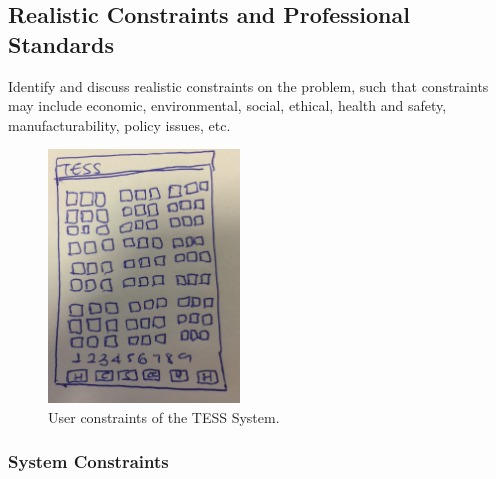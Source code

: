 \documentclass{article}
\begin{document}
\subsection{Realistic Constraints and Professional Standards}
Identify and discuss realistic constraints on the problem, such that constraints may include economic, environmental, social, ethical, health and safety, manufacturability, policy issues, etc.
\begin{figure}[ht]\centering
	\includegraphics[width=2.0in]{./Figure/User_Constraint.JPG}
	\caption{User constraints of the TESS System.}\label{fig:userconstraints}
\end{figure}

\subsubsection{System Constraints}
\end{document}
